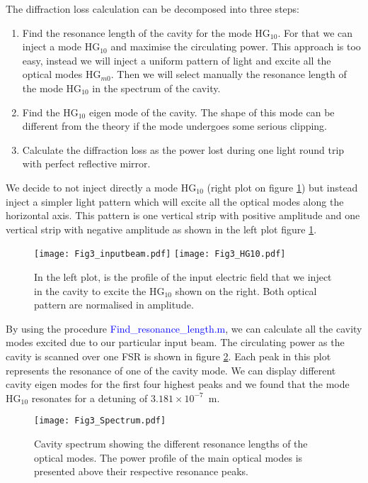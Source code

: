 The diffraction loss calculation can be decomposed into three steps:
\begin{enumerate}
  \item Find the resonance length of the cavity for the mode HG$_{10}$. For that we can inject a mode HG$_{10}$ and maximise the circulating power. This approach is too easy, instead we will inject a uniform pattern of light and excite all the optical modes HG$_{m0}$. Then we will select manually the resonance length of the mode HG$_{10}$ in the spectrum of the cavity.
  \item Find the HG$_{10}$ eigen mode of the cavity. The shape of this mode can be different from the theory if the mode undergoes some serious clipping.
  \item Calculate the diffraction loss as the power lost during one light round trip with perfect reflective mirror.
\end{enumerate}

We decide to not inject directly a mode HG$_{10}$ (right plot on figure \ref{fig3:strip}) but instead inject a simpler light pattern which will excite all the optical modes along the horizontal axis. This pattern is one vertical strip with positive amplitude and one vertical strip with negative amplitude as shown in the left plot figure \ref{fig3:strip}.\\

\begin{figure}
\begin{center}
\texttt{[image: Fig3\_inputbeam.pdf]}\hfill
\texttt{[image: Fig3\_HG10.pdf]}
\end{center}
\caption{In the left plot, is the profile of the input electric field that we inject in the cavity to excite the HG$_{10}$ shown on the right. Both optical pattern are normalised in amplitude.\label{fig3:strip}}
\end{figure}

By using the procedure \textcolor{blue}{Find\_resonance\_length.m}, we can calculate all the cavity modes excited due to our particular input beam. The circulating power as the cavity is scanned over one FSR is shown in figure \ref{fig3:cav_spec}. Each peak in this plot represents the resonance of one of the cavity mode. We can display different cavity eigen modes for the first four highest peaks and we found that the mode HG$_{10}$ resonates for a detuning of $3.181\times 10^{-7}$~m.

\begin{figure}
\begin{center}
\texttt{[image: Fig3\_Spectrum.pdf]}
\end{center}
\caption{Cavity spectrum showing the different resonance lengths of the optical modes. The power profile of the main optical modes is presented above their respective resonance peaks.\label{fig3:cav_spec}}
\end{figure}

